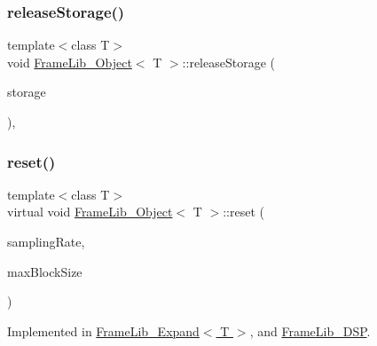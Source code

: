 \mbox{\label{class_frame_lib___object_a4c131dff9d634f17696fb3ae6be06e9b}} 
\subsubsection{\texorpdfstring{release\+Storage()}{releaseStorage()}}
{\footnotesize\ttfamily template$<$class T$>$ \\
void \hyperlink{class_frame_lib___object}{Frame\+Lib\+\_\+\+Object}$<$ T $>$\+::release\+Storage (\begin{DoxyParamCaption}\item[{\hyperlink{class_frame_lib___local_allocator_1_1_storage}{Frame\+Lib\+\_\+\+Local\+Allocator\+::\+Storage} $\ast$\&}]{storage }\end{DoxyParamCaption})\hspace{0.3cm}{\ttfamily [inline]}, {\ttfamily [protected]}}

\mbox{\label{class_frame_lib___object_aeb02311ab422dd569aeb982e31a66893}} 
\subsubsection{\texorpdfstring{reset()}{reset()}}
{\footnotesize\ttfamily template$<$class T$>$ \\
virtual void \hyperlink{class_frame_lib___object}{Frame\+Lib\+\_\+\+Object}$<$ T $>$\+::reset (\begin{DoxyParamCaption}\item[{double}]{sampling\+Rate,  }\item[{unsigned long}]{max\+Block\+Size }\end{DoxyParamCaption})\hspace{0.3cm}{\ttfamily [pure virtual]}}



Implemented in \hyperlink{class_frame_lib___expand_aab1637f19abfa1ca21abb9f2bbff6062}{Frame\+Lib\+\_\+\+Expand$<$ T $>$}, and \hyperlink{class_frame_lib___d_s_p_a0b0edaaaa82b80f3800918283a6a46f0}{Frame\+Lib\+\_\+\+D\+SP}.

\mbox{\label{class_frame_lib___object_a0d3bed42a21ebf248366f4457722beff}} 
